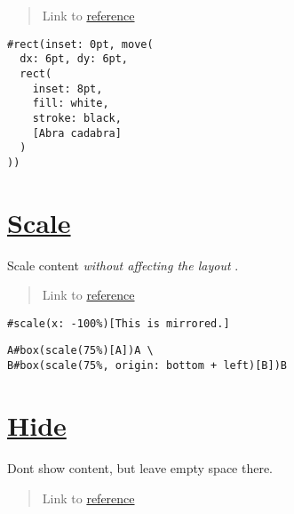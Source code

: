 \begin{quote}
Link to \href{https://typst.app/docs/reference/layout/move/}{reference}
\end{quote}

\begin{verbatim}
#rect(inset: 0pt, move(
  dx: 6pt, dy: 6pt,
  rect(
    inset: 8pt,
    fill: white,
    stroke: black,
    [Abra cadabra]
  )
))
\end{verbatim}

\pandocbounded{}

\section{\texorpdfstring{\hyperref[scale]{Scale}}{Scale}}\label{scale}

Scale content \emph{without affecting the layout} .

\begin{quote}
Link to \href{https://typst.app/docs/reference/layout/scale/}{reference}
\end{quote}

\begin{verbatim}
#scale(x: -100%)[This is mirrored.]
\end{verbatim}

\pandocbounded{}

\begin{verbatim}
A#box(scale(75%)[A])A \
B#box(scale(75%, origin: bottom + left)[B])B
\end{verbatim}

\pandocbounded{}

\section{\texorpdfstring{\hyperref[hide]{Hide}}{Hide}}\label{hide}

Don\textquotesingle t show content, but leave empty space there.

\begin{quote}
Link to \href{https://typst.app/docs/reference/layout/hide/}{reference}
\end{quote}


